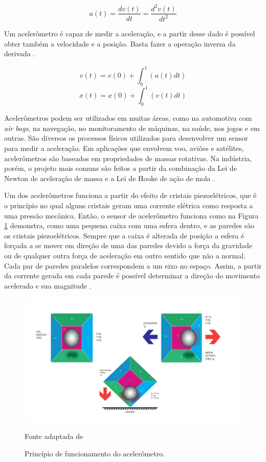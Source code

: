 				\begin{equation}
				a(t) = \frac{dv(t)}{dt} = \frac{d^2v(t)}{dt^2} 
				\end{equation}
				
				Um acelerômetro é capaz de medir a aceleração, e a partir desse dado é possível obter também a velocidade e a posição. Basta fazer a operação inversa da derivada \cite{moyses2013}.
				
				\begin{equation}
				v(t) = v(0) + \int_{0}^{1}(a(t)dt)
				\end{equation}
				\begin{equation}
				x(t) = x(0) + \int_{0}^{1}(v(t)dt)
				\end{equation}
				
				Acelerômetros podem ser utilizados em muitas áreas, como na  automotiva com \textit{air bags}, na navegação, no monitoramento de máquinas, na saúde, nos jogos e em outras. São diversos os processos físicos utilizados para desenvolver um sensor para medir a aceleração. Em aplicações que envolvem voo, aviões e satélites,
				acelerômetros são baseados em propriedades de massas rotativas. Na indústria,
				porém, o projeto mais comuns são feitos a partir da combinação da Lei de Newton de
				aceleração de massa e a Lei de Hooke de ação de mola \cite{carneiro2003}.
				
				Um dos acelerômetros funciona a partir do efeito de cristais piezoelétricos, que é o princípio no qual alguns cristais geram uma corrente elétrica como resposta a uma pressão mecânica. Então, o sensor de acelerômetro  funciona como na Figura \ref{acel} demonstra, como uma pequena caixa com uma esfera dentro, e as paredes são os cristais piezoelétricos.  Sempre que a caixa é alterada de posição a esfera é forçada a se mover em direção de uma das paredes devido a força da gravidade ou de qualquer outra força de aceleração em outro sentido que não a normal. Cada par de paredes paralelos correspondem a um eixo no espaço. Assim, a partir da corrente gerada em cada parede é possível determinar a direção do movimento acelerado e sua magnitude \cite{Sanjeev2018}.
				
				\begin{figure}[h]
					\centering
					\includegraphics[keepaspectratio=true,scale=0.8
					]{figuras/acelerometro.PNG}
					\caption{Princípio de funcionamento do acelerômetro.}
					Fonte adaptada de \cite{Sanjeev2018}
					\label{acel}
				\end{figure}
	
